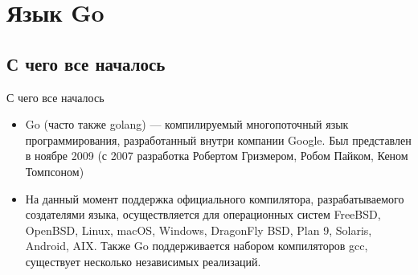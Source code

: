 \section{Язык Go}
\subsection{С чего все началось}
\begin{frame}{С чего все началось}
\begin{itemize}
    \item Go (часто также golang) — компилируемый многопоточный язык программирования, разработанный внутри компании Google. Был представлен в ноябре 2009 (с 2007 разработка Робертом Гризмером, Робом Пайком, Кеном Томпсоном)
    \item На данный момент поддержка официального компилятора, разрабатываемого создателями языка, осуществляется для операционных систем FreeBSD, OpenBSD, Linux, macOS, Windows, DragonFly BSD, Plan 9, Solaris, Android, AIX. Также Go поддерживается набором компиляторов gcc, существует несколько независимых реализаций.
\end{itemize}
\end{frame}
